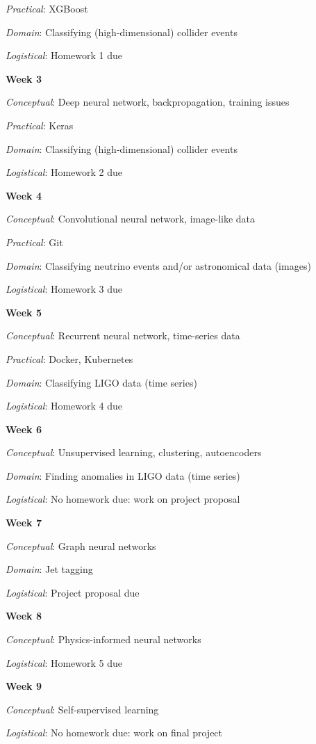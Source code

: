 \documentclass[12pt]{article}
\begin{document}
\emph{Practical}: XGBoost

\emph{Domain}: Classifying (high-dimensional) collider events

\emph{Logistical}: Homework 1 due

\textbf{Week 3}

\emph{Conceptual}: Deep neural network, backpropagation, training issues

\emph{Practical}: Keras

\emph{Domain}: Classifying (high-dimensional) collider events

\emph{Logistical}: Homework 2 due

\textbf{Week 4}

\emph{Conceptual}: Convolutional neural network, image-like data

\emph{Practical}: Git

\emph{Domain}: Classifying neutrino events and/or astronomical data (images)

\emph{Logistical}: Homework 3 due

\textbf{Week 5}

\emph{Conceptual}: Recurrent neural network, time-series data

\emph{Practical}: Docker, Kubernetes

\emph{Domain}: Classifying LIGO data (time series)

\emph{Logistical}: Homework 4 due

\textbf{Week 6}

\emph{Conceptual}: Unsupervised learning, clustering, autoencoders

\emph{Domain}: Finding anomalies in LIGO data (time series)

\emph{Logistical}: No homework due: work on project proposal

\textbf{Week 7}

\emph{Conceptual}: Graph neural networks

\emph{Domain}: Jet tagging

\emph{Logistical}: Project proposal due

\textbf{Week 8}

\emph{Conceptual}: Physics-informed neural networks

\emph{Logistical}: Homework 5 due

\textbf{Week 9}

\emph{Conceptual}: Self-supervised learning

\emph{Logistical}: No homework due: work on final project
\end{document}
